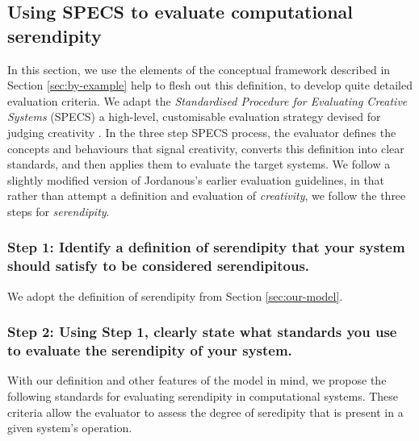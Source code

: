 \subsection{Using SPECS to evaluate computational serendipity}\label{specs-overview}

In this section, we use the elements of the conceptual framework
described in Section \ref{sec:by-example} help to flesh out this
definition, to develop quite detailed evaluation criteria.
We adapt the \emph{Standardised Procedure for Evaluating Creative Systems} (SPECS)
a high-level, customisable evaluation strategy devised for judging creativity \cite{jordanous:12}.  
%
In the three step SPECS process, the evaluator defines the concepts
and behaviours that signal creativity, converts this definition into
clear standards, and then applies them to evaluate the target systems.
%
We follow a slightly modified version of Jordanous's earlier evaluation
guidelines, in that rather than attempt a definition and evaluation of
{\em creativity}, we follow the three steps for \emph{serendipity}.

\subsubsection*{Step 1: Identify a definition of serendipity that your system should satisfy to be considered serendipitous.}

\noindent We adopt the definition of serendipity from Section
\ref{sec:our-model}.

\subsubsection*{Step 2: Using Step 1, clearly state what standards you use to evaluate the serendipity of your system.}

\noindent With our definition and other features of the model in mind, we propose the following standards for evaluating serendipity in computational systems. These criteria allow the evaluator to assess the degree of seredipity that is present in a given system's operation.


